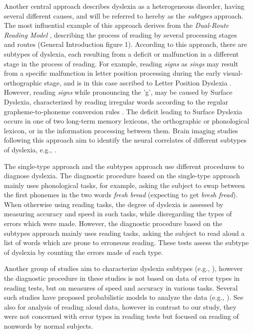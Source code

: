 Another central approach describes dyslexia as a heterogeneous disorder, having several different causes, and will be referred to hereby as the {\it subtypes} approach. The most influential example of this approach derives from the {\it Dual-Route Reading Model} \citep{cc93, ck12, mn73}, describing the process of reading by several processing stages and routes (General Introduction figure 1). According to this approach, there are subtypes of dyslexia, each resulting from a deficit or malfunction in a different stage in the process of reading. For example, reading {\it signs} as {\it sings} may result from a specific malfunction in letter position processing during the early visual-orthographic stage, and is in this case ascribed to Letter Position Dyslexia \citep{fg01}. However, reading {\it signs} while pronouncing the 'g', may be caused by Surface Dyslexia, characterized by reading irregular words according to the regular grapheme-to-phoneme conversion rules \citep{c83}. The deficit leading to Surface Dyslexia occurs in one of two long-term memory lexicons, the orthographic or phonological lexicon, or in the information processing between them. Brain imaging studies following this approach aim to identify the neural correlates of different subtypes of dyslexia, e.g., \citep{jct03, lptbadc09}.

The single-type approach and the subtypes approach use different procedures to diagnose dyslexia. The diagnostic procedure based on the single-type approach mainly uses phonological tasks, for example, asking the subject to swap between the first phonemes in the two words {\it fresh bread} (expecting to get {\it bresh fread}). When otherwise using reading tasks, the degree of dyslexia is assessed by measuring accuracy and speed in such tasks, while disregarding the types of errors which were made. However, the diagnostic procedure based on the subtypes approach mainly uses reading tasks, asking the subject to read aloud a list of words which are prone to erroneous reading. These tests assess the subtype of dyslexia by counting the errors made of each type. 

Another group of studies aim to characterize dyslexia subtypes (e.g., \citealp{p06}), however the diagnostic procedure in these studies is not based on data of error types in reading tests, but on measures of speed and accuracy in various tasks. Several such studies have proposed probabilistic models to analyze the data (e.g., \citealp{plljbrak12}). See also \citet{rp14} for analysis of reading aloud data, however in contrast to our study, they were not concerned with error types in reading tests but focused on reading of nonwords by normal subjects.

